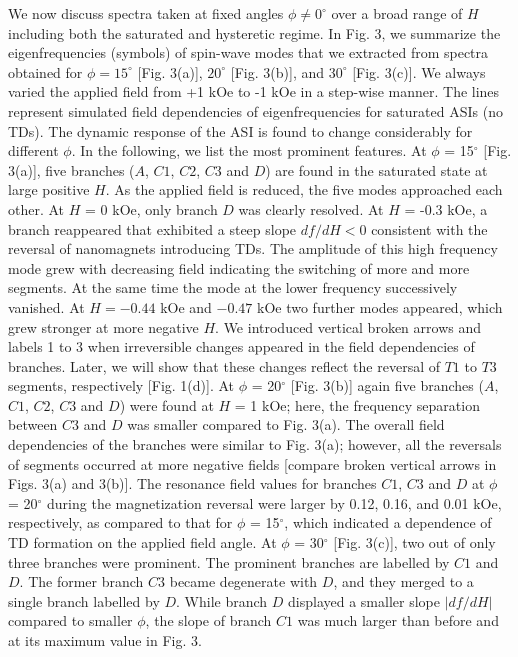 \documentclass[aps,prl,preprint,showpacs,superscriptaddress,groupedaddress]{revtex4}%
\begin{document}
We now discuss spectra taken at fixed angles $\phi \neq 0^{\circ}$ over a broad range of $H$ including both the saturated and hysteretic regime. In Fig. 3, we summarize the eigenfrequencies (symbols) of spin-wave modes that we extracted from spectra obtained for $\phi = 15^{\circ}$ [Fig. 3(a)], $ 20^{\circ}  $ [Fig. 3(b)],  and $ 30^{\circ} $ [Fig. 3(c)]. We always varied the applied field from +1 kOe to -1 kOe in a step-wise manner. The lines represent simulated field dependencies of eigenfrequencies for saturated ASIs (no TDs). The dynamic response of the ASI is found to change considerably for different $\phi$. In the following, we list the most prominent features.  At $\phi$ = 15$^{\circ}$ [Fig. 3(a)],  five  branches ($A$, $C1$, $C2$, $C3$ and $D$) are found in the  saturated state at large positive $H$. As the applied field is reduced, the five modes approached each other. At $H$ = 0 kOe, only branch $D$ was clearly resolved.  At $ H $ = -0.3 kOe, a branch reappeared that exhibited a steep slope $df/dH<0$ consistent with the reversal of nanomagnets introducing TDs. The amplitude of this high frequency mode grew with decreasing field indicating the switching of more and more segments. At the same time the mode at the lower frequency successively vanished. At $H= -0.44$ kOe and $-0.47$ kOe two further modes appeared, which grew stronger at more negative $H$.  We introduced vertical broken arrows and labels 1 to 3 when irreversible changes appeared in the field dependencies of branches. Later, we will show that these changes reflect the reversal of $T1$  to $T3$ segments, respectively [Fig. 1(d)]. At  $\phi$ = 20$^{\circ}$ [Fig. 3(b)] again  five  branches ($A$, $C1$, $C2$, $C3$ and $D$) were found at $H$ = 1 kOe; here, the frequency separation between $C3$ and $D$ was smaller compared to Fig. 3(a). The overall field dependencies of the branches were similar to Fig. 3(a); however, all the reversals of segments occurred at more negative fields [compare broken vertical arrows in Figs. 3(a) and 3(b)]. The resonance field values for branches $C1$, $C3$ and $D$ at $\phi$ = 20$^{\circ}$ during the magnetization reversal were larger by 0.12, 0.16, and 0.01 kOe, respectively, as compared to that  for $\phi$ = 15$^{\circ}$, which indicated a dependence of TD formation on the applied field angle. At  $\phi$ = 30$^{\circ}$ [Fig. 3(c)], two out of only three branches were prominent. The prominent branches are labelled by $ C1 $ and $ D $. The former branch $ C3 $ became degenerate with $ D $, and they merged to a single branch labelled by $D$. While branch $D$  displayed a smaller slope $|df/dH|$ compared to smaller $\phi$, the slope of branch $C1$ was much larger than before and at its maximum value in Fig. 3.
\end{document}
